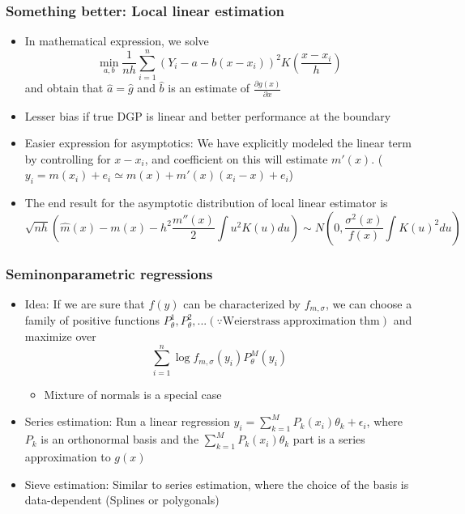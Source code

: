 \documentclass[aspectratio=169]{beamer}
\begin{document}
\begin{frame}
\frametitle{Something better: Local linear estimation}
 \begin{itemize}
\item   In mathematical expression, we solve
 \[
 \min_{a,b}\frac{1}{nh}\sum_{i=1}^n(Y_i-a-b(x-x_i))^2K\left(\frac{x-x_i}{h}\right)
 \]
 and obtain that $\hat{a}=\hat{g}$ and $\hat{b}$ is an estimate of $\frac{\partial g(x)}{\partial x}$
 \item Lesser bias if true DGP is linear and better performance at the boundary
 \item Easier expression for asymptotics: We have explicitly modeled the linear term by controlling for $x-x_i$, and coefficient on this will estimate $m'(x)$. ($ y_i = m(x_i)+e_i \simeq m(x) + m'(x)(x_i-x)+e_i$)
 \item The end result for the asymptotic distribution of local linear estimator is 
 \[
 \sqrt{nh}\left(\hat{m}(x)-m(x)-h^2 \frac{m''(x)}{2} \int u^2K(u)du\right)\sim N\left(0, \frac{\sigma^2(x)}{f(x)}\int K\left(u\right)^2du \right)
 \]
 \end{itemize}
\end{frame}


\begin{frame}
\frametitle{Seminonparametric regressions}
 \begin{itemize}
\item Idea:  If we are sure that $f(y)$ can be characterized by $f_{m,\sigma}$, we can choose a family of positive functions $P_\theta^1, P_\theta^2,...(\because \text{Weierstrass approximation thm})$ and maximize over
\[
\sum_{i=1}^n \log{f_{m,\sigma}(y_i)}P_\theta^M(y_i)
\]
\begin{itemize}
\item Mixture of normals is a special case
 \end{itemize}
\item Series estimation:  Run a linear regression $ y_i = \sum_{k=1}^MP_k(x_i)\theta_k+\epsilon_i$, 
where $P_k$ is an orthonormal basis and the $\sum_{k=1}^MP_k(x_i)\theta_k$ part is a series approximation to $g(x)$
\item Sieve estimation: Similar to series estimation, where the choice of the basis is data-dependent (Splines or polygonals)
 \end{itemize}
\end{frame}
\end{document}
